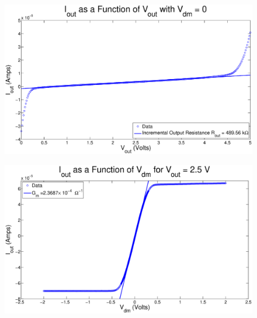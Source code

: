 \begin{figure}[H]
\centering
\includegraphics[width=\linewidth]{../Figures/Exp2P2.eps}
\caption{}
\label{fig:exp2p2}
\end{figure}

\begin{figure}[H]
\centering
\includegraphics[width=\linewidth]{../Figures/Exp2P3.eps}
\caption{}
\label{fig:exp2p3}
\end{figure}